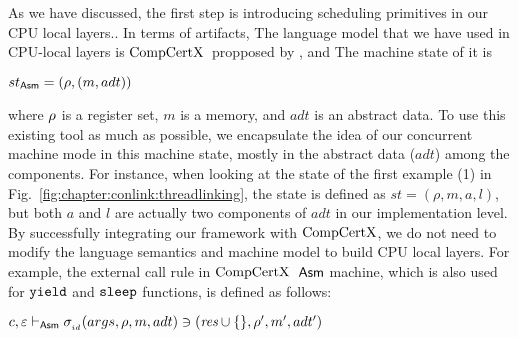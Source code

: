 As we have discussed,
the first step is introducing scheduling primitives in our CPU local layers..
In terms of artifacts, 
The language model that we have used in CPU-local layers is $\mathrm{CompCertX}$\ propposed by \cite{deepspec}, and 
The machine state of it is
\begin{center}
$st_{\mathsf{Asm}} = (\rho, (m, adt))$
\end{center}
where $\rho$ is a register set, $m$ is a memory, and $adt$ is an abstract data.
To use this existing tool as much as possible, we encapsulate the idea of 
our concurrent machine mode in this machine state, 
mostly in the abstract data ($adt$) among the components.
For instance, when looking at the state of the first example (1) in Fig.~\ref{fig:chapter:conlink:threadlinking}, the state is defined as $st = (\rho, m, a, l)$, but both $a$ and $l$ are actually two components of $adt$ in our implementation level.
By successfully integrating our framework with $\mathrm{CompCertX}$, we do not need to modify the language semantics and machine model
to build CPU local layers.
For example, the external call rule in $\mathrm{CompCertX}$\ $\mathsf{Asm}$ machine, 
which is also used for ${\mathrm{\texttt{yield}}}$ and ${\mathrm{\texttt{sleep}}}$ functions,  
is defined as follows:
\begin{center}
$c, {\varepsilon} \vdash_{\mathsf{Asm}} \sigma_{_{id}}(args, \rho, m, adt) \ni (\textit{res}\cup \{\}, \rho',  m', adt')$
\end{center}
